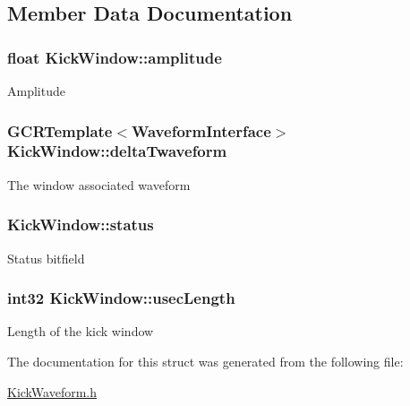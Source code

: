 \subsection{Member Data Documentation}
\hypertarget{structKickWindow_a19abd0bca8e2503f7d6e2eac912071b6}{
\subsubsection[{amplitude}]{\setlength{\rightskip}{0pt plus 5cm}float {\bf KickWindow::amplitude}}}
\label{structKickWindow_a19abd0bca8e2503f7d6e2eac912071b6}
Amplitude \hypertarget{structKickWindow_ac35a8cd53ad6c399fa7abfea65d5a0eb}{
\subsubsection[{deltaTwaveform}]{\setlength{\rightskip}{0pt plus 5cm}GCRTemplate$<${\bf WaveformInterface}$>$ {\bf KickWindow::deltaTwaveform}}}
\label{structKickWindow_ac35a8cd53ad6c399fa7abfea65d5a0eb}
The window associated waveform \hypertarget{structKickWindow_ad9a832cfa230098138426e8cd7ac18b6}{
\subsubsection[{status}]{ {\bf KickWindow::status}}}
\label{structKickWindow_ad9a832cfa230098138426e8cd7ac18b6}
Status bitfield \hypertarget{structKickWindow_ab7d5f6704ca1b06adcce2fbbd28fd0bd}{
\subsubsection[{usecLength}]{\setlength{\rightskip}{0pt plus 5cm}int32 {\bf KickWindow::usecLength}}}
\label{structKickWindow_ab7d5f6704ca1b06adcce2fbbd28fd0bd}
Length of the kick window 

The documentation for this struct was generated from the following file:\begin{DoxyCompactItemize}
\item 
\hyperlink{KickWaveform_8h}{KickWaveform.h}\end{DoxyCompactItemize}
